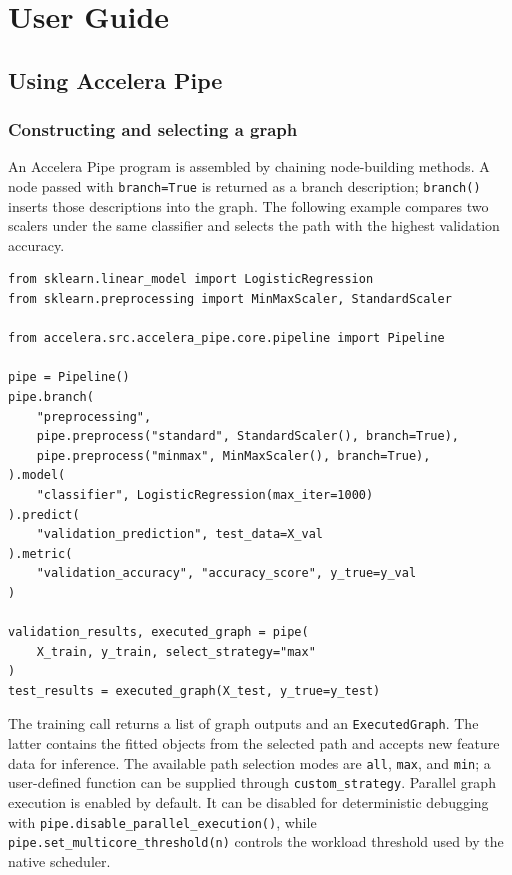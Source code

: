 \documentclass[12pt,a4paper]{report}
\renewcommand{\lstlistingname}{Algorithm}
\begin{document}
\renewcommand{\lstlistingname}{Code Example}
\chapter{User Guide}

\section{Using Accelera Pipe}
\subsection{Constructing and selecting a graph}
An Accelera Pipe program is assembled by chaining node-building methods. A
node passed with \texttt{branch=True} is returned as a branch description;
\texttt{branch()} inserts those descriptions into the graph. The following
example compares two scalers under the same classifier and selects the path
with the highest validation accuracy.

\begin{lstlisting}[style=code,caption={Building and selecting an Accelera Pipe graph}]
from sklearn.linear_model import LogisticRegression
from sklearn.preprocessing import MinMaxScaler, StandardScaler

from accelera.src.accelera_pipe.core.pipeline import Pipeline

pipe = Pipeline()
pipe.branch(
    "preprocessing",
    pipe.preprocess("standard", StandardScaler(), branch=True),
    pipe.preprocess("minmax", MinMaxScaler(), branch=True),
).model(
    "classifier", LogisticRegression(max_iter=1000)
).predict(
    "validation_prediction", test_data=X_val
).metric(
    "validation_accuracy", "accuracy_score", y_true=y_val
)

validation_results, executed_graph = pipe(
    X_train, y_train, select_strategy="max"
)
test_results = executed_graph(X_test, y_true=y_test)
\end{lstlisting}

The training call returns a list of graph outputs and an
\texttt{ExecutedGraph}. The latter contains the fitted objects from the
selected path and accepts new feature data for inference. The available path
selection modes are \texttt{all}, \texttt{max}, and \texttt{min}; a user-defined
function can be supplied through \texttt{custom\_strategy}. Parallel graph
execution is enabled by default. It can be disabled for deterministic debugging
with \texttt{pipe.disable\_parallel\_execution()}, while
\texttt{pipe.set\_multicore\_threshold(n)} controls the workload threshold used
by the native scheduler.
\end{document}
